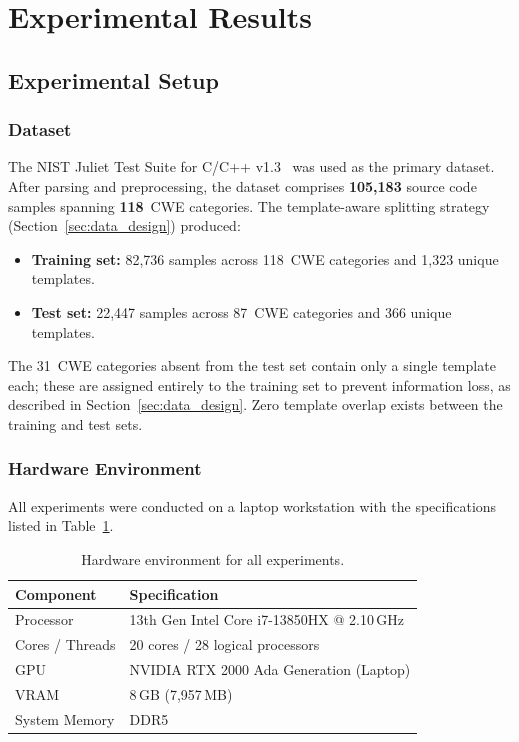 \documentclass[conference]{IEEEtran}
\begin{document}

\section{Experimental Results}
\label{sec:results}

\subsection{Experimental Setup}
\label{sec:setup}

\subsubsection{Dataset}
The NIST Juliet Test Suite for C/C++ v1.3~\cite{juliet2017} was used as the
primary dataset.  After parsing and preprocessing, the dataset comprises
\textbf{105,183} source code samples spanning \textbf{118}~CWE categories.
The template-aware splitting strategy (Section~\ref{sec:data_design})
produced:
\begin{itemize}
    \item \textbf{Training set:} 82,736 samples across 118~CWE categories
          and 1,323 unique templates.
    \item \textbf{Test set:} 22,447 samples across 87~CWE categories
          and 366 unique templates.
\end{itemize}
The 31~CWE categories absent from the test set contain only a single
template each; these are assigned entirely to the training set to prevent
information loss, as described in Section~\ref{sec:data_design}.
Zero template overlap exists between the training and test sets.

\subsubsection{Hardware Environment}
All experiments were conducted on a laptop workstation with the
specifications listed in Table~\ref{tab:hardware}.

\begin{table}[t]
\centering
\caption{Hardware environment for all experiments.}
\label{tab:hardware}
\begin{tabular}{ll}
\hline
\textbf{Component}    & \textbf{Specification} \\
\hline
Processor             & 13th Gen Intel Core i7-13850HX @ 2.10\,GHz \\
Cores / Threads       & 20 cores / 28 logical processors \\
GPU                   & NVIDIA RTX 2000 Ada Generation (Laptop) \\
VRAM                  & 8\,GB (7,957\,MB) \\
System Memory         & DDR5 \\
\hline
\end{tabular}
\end{table}
\end{document}
